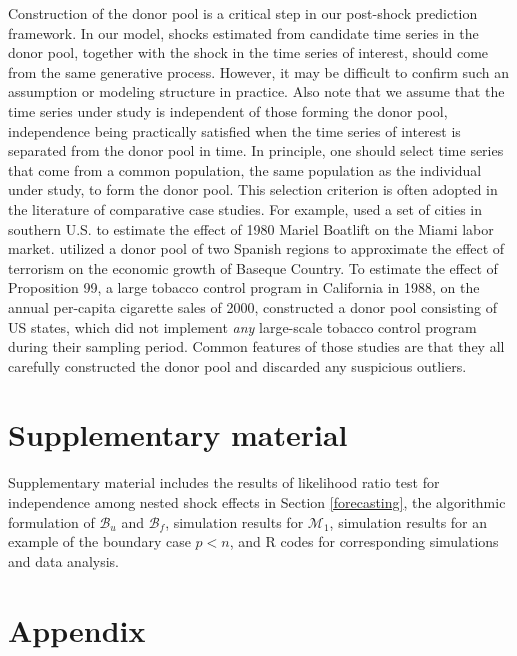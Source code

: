 \documentclass[11pt,3p,review,authoryear]{elsarticle}
\def\mc#1{\mathcal{#1}} %
\theoremstyle{definition}
\begin{document}
Construction of the donor pool is a critical step in our post-shock prediction framework. In our model, shocks estimated from candidate time series in the donor pool, together with the shock in the time series of interest, should come from the same generative process. However, it may be difficult to confirm such an assumption or modeling structure in practice. Also note that we assume that the time series under study is independent of those forming the donor pool, independence being practically satisfied when the time series of interest is separated from the donor pool in time. In principle, one should select time series that come from a common population, the same population as the individual under study, to form the donor pool. This selection criterion is often adopted in the literature of comparative case studies. For example, \citet{card1990impact} used a set of cities in southern U.S. to estimate the effect of 1980 Mariel Boatlift on the Miami labor market. \citet{abadie2003economic} utilized a donor pool of two Spanish regions to approximate the effect of terrorism on  the economic growth of Baseque Country. To estimate the effect of Proposition 99, a large tobacco control program in California  in 1988, on the annual per-capita cigarette sales of 2000, \cite{abadie2010synthetic} constructed a donor pool consisting of US states, which did not implement \emph{any} large-scale tobacco control program during their sampling period. Common features of those studies are that they all carefully constructed the donor pool and discarded any suspicious outliers. 


\section{Supplementary material}

Supplementary material includes the results of  likelihood ratio test for independence among nested shock effects in Section \ref{forecasting}, the algorithmic formulation of $\mc{B}_u$ and $\mc{B}_f$, simulation results for $\mc{M}_1$, simulation results for an example of the boundary case $p < n$, and R codes for corresponding simulations and data analysis.





  
\section{Appendix}
\label{proofs}
\end{document}
